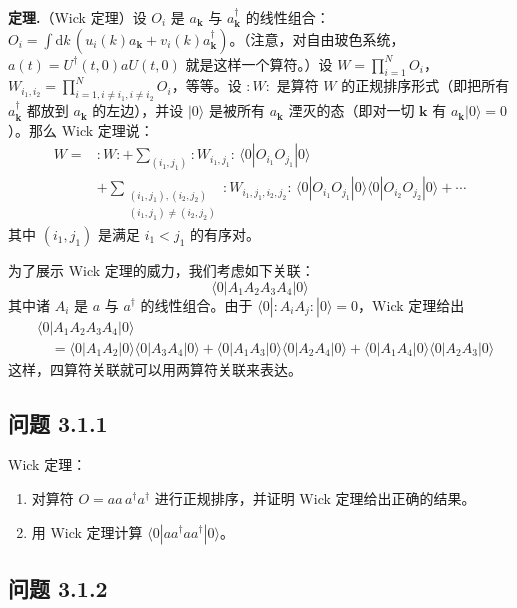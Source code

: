 \textbf{定理.}（Wick 定理）设 $O_i$ 是 $a_{\pmb{k}}$ 与 $a_{\pmb{k}}^{\dagger}$ 的线性组合：$O_i=\int \mathrm{d}k\,\left(u_i(k)a_{\pmb{k}}+v_i(k)a_{\pmb{k}}^{\dagger}\right)$。（注意，对自由玻色系统，$a(t)=U^{\dagger}(t,0)aU(t,0)$ 就是这样一个算符。）设 $W=\prod_{i=1}^{N}O_i$，$W_{i_1,i_2}=\prod_{i=1,i\neq i_1,i\neq i_2}^{N}O_i$，等等。设 $:W:$ 是算符 $W$ 的正规排序形式（即把所有 $a_{\pmb{k}}^{\dagger}$ 都放到 $a_{\pmb{k}}$ 的左边），并设 $|0\rangle$ 是被所有 $a_{\pmb{k}}$ 湮灭的态（即对一切 $\pmb{k}$ 有 $a_{\pmb{k}}|0\rangle=0$）。那么 Wick 定理说：
\begin{align*}
W={}&:W:+\sum_{(i_1,j_1)}:W_{i_1,j_1}:\,\langle 0|O_{i_1}O_{j_1}|0\rangle\\
&+\sum_{\substack{(i_1,j_1),(i_2,j_2)\\ (i_1,j_1)\neq(i_2,j_2)}}:W_{i_1,j_1,i_2,j_2}:\,\langle 0|O_{i_1}O_{j_1}|0\rangle\langle 0|O_{i_2}O_{j_2}|0\rangle+\cdots\tag{3.1.2}
\end{align*}
其中 $(i_1,j_1)$ 是满足 $i_1<j_1$ 的有序对。

为了展示 Wick 定理的威力，我们考虑如下关联：
\begin{equation*}
\langle 0|A_1A_2A_3A_4|0\rangle
\end{equation*}
其中诸 $A_i$ 是 $a$ 与 $a^{\dagger}$ 的线性组合。由于 $\langle 0|:A_iA_j:|0\rangle=0$，Wick 定理给出
\begin{align*}
&\langle 0|A_1A_2A_3A_4|0\rangle\\
&\quad=\langle 0|A_1A_2|0\rangle\langle 0|A_3A_4|0\rangle+\langle 0|A_1A_3|0\rangle\langle 0|A_2A_4|0\rangle+\langle 0|A_1A_4|0\rangle\langle 0|A_2A_3|0\rangle
\end{align*}
这样，四算符关联就可以用两算符关联来表达。

\subsection*{问题 3.1.1}

Wick 定理：
\begin{enumerate}
\item 对算符 $O=aa\,a^{\dagger}a^{\dagger}$ 进行正规排序，并证明 Wick 定理给出正确的结果。
\item 用 Wick 定理计算 $\langle 0|aa^{\dagger}aa^{\dagger}|0\rangle$。
\end{enumerate}

\subsection*{问题 3.1.2}

